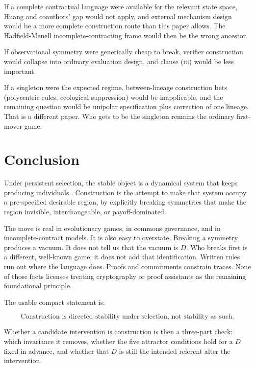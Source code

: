 \documentclass[11pt]{article}
\begin{document}
If a complete contractual language were available for the relevant state space, Huang and coauthors' gap would not apply, and external mechanism design would be a more complete construction route than this paper allows. The Hadfield-Menell incomplete-contracting frame would then be the wrong ancestor.

If observational symmetry were generically cheap to break, verifier construction would collapse into ordinary evaluation design, and clause (iii) would be less important.

If a singleton were the expected regime, between-lineage construction bets (polycentric rules, ecological suppression) would be inapplicable, and the remaining question would be unipolar specification plus correction of one lineage. That is a different paper. Who gets to be the singleton remains the ordinary first-mover game.

\section{Conclusion}

Under persistent selection, the stable object is a dynamical system that keeps producing individuals \parencite{zarncke2026selection}. Construction is the attempt to make that system occupy a pre-specified desirable region, by explicitly breaking symmetries that make the region invisible, interchangeable, or payoff-dominated.

The move is real in evolutionary games, in commons governance, and in incomplete-contract models. It is also easy to overstate. Breaking a symmetry produces a vacuum. It does not tell us that the vacuum is \(D\). Who breaks first is a different, well-known game; it does not add that identification. Written rules run out where the language does. Proofs and commitments constrain traces. None of those facts licenses treating cryptography or proof assistants as the remaining foundational principle.

The usable compact statement is:

\begin{equation}
    \boxed{\text{Construction is directed stability under selection, not stability as such.}}
\end{equation}

Whether a candidate intervention is construction is then a three-part check: which invariance it removes, whether the five attractor conditions hold for a \(D\) fixed in advance, and whether that \(D\) is still the intended referent after the intervention.

\printbibliography
\end{document}
